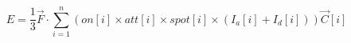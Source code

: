 \documentclass{article}
\begin{document}
$$ E= \frac{1}{3} \vec F \cdot {\sum_{i=1}^{n} \left( on[i] \times att[i] \times spot[i] \times (I_a[i] + I_d[i]) \right) \vec C[i] } $$
\end{document}
